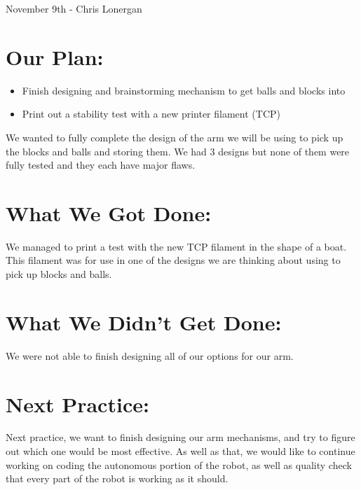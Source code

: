 \documentclass[12pt]{article}
\begin{document}
November 9th - Chris Lonergan

\section{Our Plan:} 
\begin{itemize}
	\item Finish designing and brainstorming mechanism to get balls and blocks into  
	\item Print out a stability test with a new printer filament (TCP)
\end{itemize}

We wanted to fully complete the design of the arm we will be using to pick up the blocks and balls and storing them. We had 3 designs but none of them were fully tested and they each have major flaws.

\section{What We Got Done:} 

We managed to print a test with the new TCP filament in the shape of a boat. This filament was for use in one of the designs we are thinking about using to pick up blocks and balls.

\section{What We Didn't Get Done:} 

We were not able to finish designing all of our options for our arm.

\section{Next Practice:}

Next practice, we want to finish designing our arm mechanisms, and try to figure out which one would be most effective. As well as that, we would like to continue working on coding the autonomous portion of the robot, as well as quality check that every part of the robot is working as it should.
\end{document}

